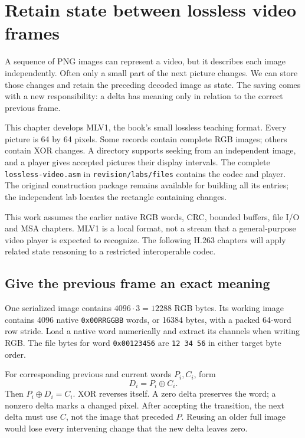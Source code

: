 \chapter{Retain state between lossless video frames}
\label{revision:lossless-video}

A sequence of PNG images can represent a video, but it describes each image
independently. Often only a small part of the next picture changes. We can
store those changes and retain the preceding decoded image as state. The
saving comes with a new responsibility: a delta has meaning only in relation
to the correct previous frame.

This chapter develops MLV1, the book's small lossless teaching format. Every
picture is 64 by 64 pixels. Some records contain complete RGB images; others
contain XOR changes. A directory supports seeking from an independent image,
and a player gives accepted pictures their display intervals. The complete
\texttt{lossless-video.asm} in \texttt{revision/labs/files} contains the codec
and player. The original construction package remains available for building
all its entries; the independent lab locates the rectangle containing changes.

This work assumes the earlier native RGB words, CRC, bounded buffers, file I/O
and MSA chapters. MLV1 is a local format, not a stream that a general-purpose
video player is expected to recognize. The following H.263 chapters will apply
related state reasoning to a restricted interoperable codec.

\section{Give the previous frame an exact meaning}

One serialized image contains $4096\cdot3=12288$ RGB bytes. Its working image
contains 4096 native \texttt{0x00RRGGBB} words, or 16384 bytes, with a packed
64-word row stride. Load a native word numerically and extract its channels
when writing RGB. The file bytes for word \texttt{0x00123456} are
\texttt{12 34 56} in either target byte order.

For corresponding previous and current words $P_i,C_i$, form
\[
  D_i=P_i\mathbin{\oplus}C_i.
\]
Then $P_i\mathbin{\oplus}D_i=C_i$. XOR reverses itself. A zero delta preserves
the word; a nonzero delta marks a changed pixel. After accepting the transition,
the next delta must use $C$, not the image that preceded $P$. Reusing an older
full image would lose every intervening change that the new delta leaves zero.

